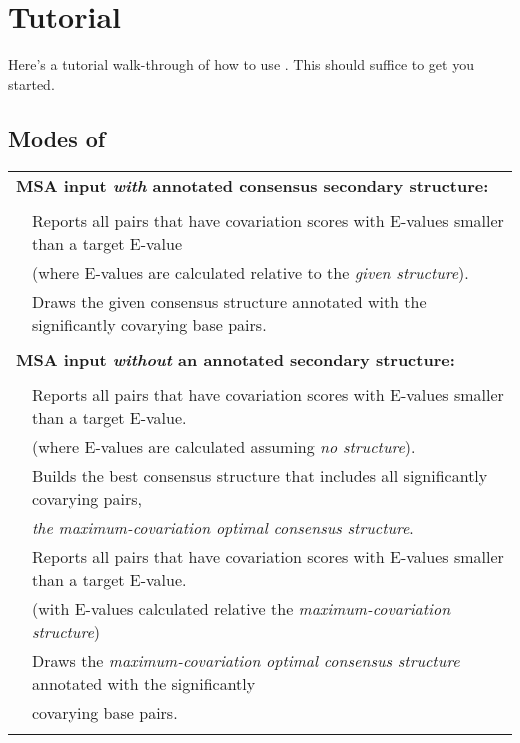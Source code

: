 
\section{Tutorial}
\label{section:tutorial}
\setcounter{footnote}{0}

Here's a tutorial walk-through of how to use \rscape. This should
suffice to get you started.

\subsection {Modes of \rscape}

\begin{tabular}{ll}
\multicolumn{2}{l}{\textbf{MSA input \textit{with} annotated consensus secondary structure:}} \\ 
 & \\ 
\textbf{}   & Reports all pairs that have covariation scores with E-values smaller than a target E-value\\
\textbf{}   & \hspace{5mm} (where E-values are calculated relative to the \emph{given structure}).\\
\textbf{}   & Draws the given consensus structure annotated with the significantly covarying base pairs.\\
 & \\ 
\multicolumn{2}{l}{\textbf{MSA input \textit{without} an annotated secondary structure:}}  \\
 & \\ 
\textbf{}   & Reports all pairs that have covariation scores with E-values smaller than a target E-value.\\
\textbf{}   & \hspace{5mm} (where E-values are calculated assuming \emph{no structure}).\\
\textbf{}   & Builds the best consensus structure that includes all significantly covarying pairs,\\
\textbf{}   & \hspace{5mm}\emph{the maximum-covariation optimal consensus structure}.\\
\textbf{}   & Reports all pairs that have covariation scores with E-values smaller than a target E-value.\\
\textbf{}   & \hspace{5mm}  (with E-values calculated relative the \emph{maximum-covariation structure})\\
\textbf{}   & Draws the \emph{maximum-covariation optimal consensus structure} annotated with the significantly \\
\textbf{}   & \hspace{5mm}covarying base pairs.\\
 & \\ 
\end{tabular} 

